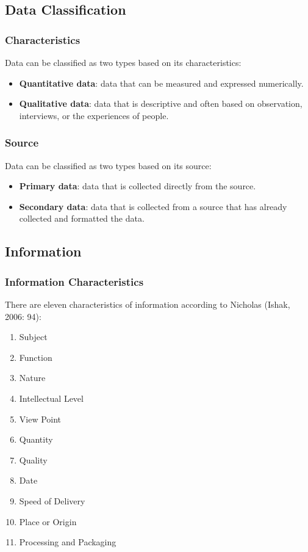 \documentclass[12pt,titlepage]{article}
\begin{document}
\subsection{Data Classification}
\subsubsection{Characteristics}
Data can be classified as two types based on its characteristics:
\begin{itemize}
    \item \textbf{Quantitative data}: data that can be measured and expressed numerically.
    \item \textbf{Qualitative data}: data that is descriptive and often based on observation, interviews, or the experiences of people.
\end{itemize}

\subsubsection{Source}
Data can be classified as two types based on its source:
\begin{itemize}
    \item \textbf{Primary data}: data that is collected directly from the source.
    \item \textbf{Secondary data}: data that is collected from a source that has already collected and formatted the data.
\end{itemize}

\subsection{Information}
\subsubsection{Information Characteristics}
There are eleven characteristics of information according to Nicholas (Ishak, 2006: 94):
\begin{enumerate}
    \item Subject
    \item Function
    \item Nature
    \item Intellectual Level
    \item View Point
    \item Quantity
    \item Quality
    \item Date
    \item Speed of Delivery
    \item Place or Origin
    \item Processing and Packaging
\end{enumerate}
\end{document}
